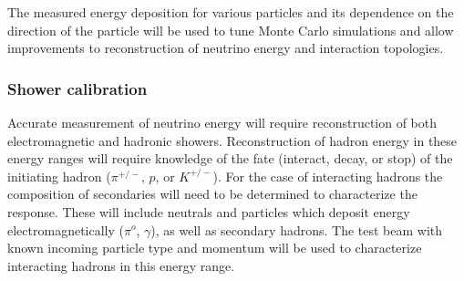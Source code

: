 The measured energy deposition for various particles and its dependence on the direction of the particle will be used to tune
Monte Carlo simulations and allow improvements to reconstruction of neutrino energy and interaction topologies. %


\subsubsection{Shower calibration}
\label{sec:showers}

Accurate measurement of neutrino energy will require reconstruction of both electromagnetic and hadronic showers. Reconstruction of hadron energy 
in these energy ranges will require knowledge of the fate (interact, decay, or stop) of the
initiating hadron ($\pi^{+/-}$, $p$, or $K^{+/-}$).
For the case of  interacting hadrons the composition of secondaries
will need to be determined to characterize the response. 
These will include neutrals and particles which 
deposit energy electromagnetically ($\pi^o$, $\gamma$), as well as
secondary hadrons.
The test beam with known incoming particle type and momentum will be used
to characterize interacting hadrons in this energy range.

